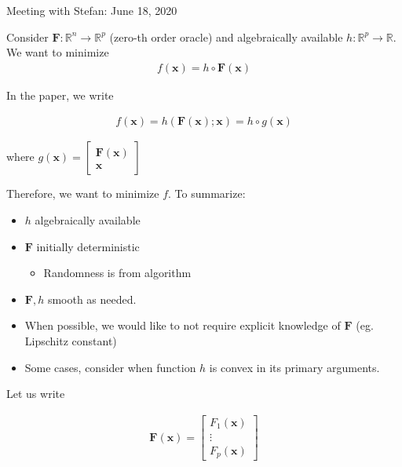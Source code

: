 \documentclass[a4paper, 11pt]{article}
\begin{document}
\noindent

\newcommand{\R}{\mathbb{R}}
\newcommand{\n}{\newline}

\begin{center}
    Meeting with Stefan: June 18, 2020
\end{center}

Consider $\mathbf{F}: \R^n \to \R^p$ (zero-th order oracle) and algebraically available $h: \R^p \to \R$. We want to minimize 
\begin{align*}
    f(\mathbf{x}) = h \circ \mathbf{F}(\mathbf{x})
\end{align*}

In the paper, we write 

\begin{align}
    f(\mathbf{x}) = h(\mathbf{F}(\mathbf{x});\mathbf{x}) = h \circ g(\mathbf{x})
\end{align}

where $g(\mathbf{x}) = \begin{bmatrix} \mathbf{F}(\mathbf{x}) \\ \mathbf{x} \end{bmatrix}$

Therefore, we want to minimize $f$. To summarize:

\begin{itemize}
    \item $h$ algebraically available
    \item $\mathbf{F}$ initially deterministic
    \begin{itemize}
        \item Randomness is from algorithm
    \end{itemize}
    \item $\mathbf{F}, h$ smooth as needed.
    \item When possible, we would like to not require explicit knowledge of $\mathbf{F}$ (eg. Lipschitz constant)
    \item Some cases, consider when function $h$ is convex in its primary arguments.
\end{itemize}

Let us write 

\begin{align}
    \mathbf{F}(\mathbf{x}) = \begin{bmatrix} F_1(\mathbf{x}) \\ \vdots \\ F_p(\mathbf{x}) \end{bmatrix}
\end{align}
\end{document}
